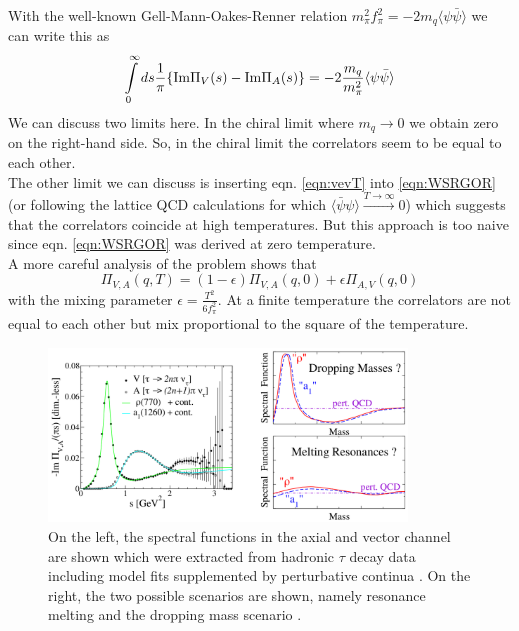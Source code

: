 With the well-known Gell-Mann-Oakes-Renner relation $m_{\pi}^2f_{\pi}^2 = - 2 m_q \langle \psi \bar{\psi} \rangle$ we can write this as
\begin{equation}
\label{eqn:WSRGOR}
\int\limits_0^{\infty} ds \frac{1}{\pi} \lbrace \mathrm{Im}\Pi_V(s) - \mathrm{Im}\Pi_A(s) \rbrace = - 2 \frac{m_q}{m_{\pi}^2} \langle \psi \bar{\psi} \rangle
\end{equation}
We can discuss two limits here. In the chiral limit where $m_q \rightarrow 0$ we obtain zero on the right-hand side. So, in the chiral limit the correlators seem to be equal to each other. \\
The other limit we can discuss is inserting eqn. \ref{eqn:vevT} into \ref{eqn:WSRGOR} (or following the lattice QCD calculations for which $\langle \bar{\psi} \psi \rangle \overset{T \rightarrow \infty}{\longrightarrow} 0$) which suggests that the correlators coincide at high temperatures. 
But this approach is too naive since eqn. \ref{eqn:WSRGOR} was derived at zero temperature. \\
A more careful analysis of the problem shows that \cite{DeyAVmixing}
\begin{equation}
\Pi_{V,A}(q,T) = (1-\epsilon) \Pi_{V,A}(q,0) + \epsilon \Pi_{A,V}(q,0)
\end{equation}
with the mixing parameter $\epsilon = \frac{T^2}{6f_{\pi}^2}$. At a finite temperature the correlators are not equal to each other but mix proportional to the square of the temperature. \\
\begin{figure}[t]
	\centering
	\includegraphics[width=0.85\textwidth]{Figures/SpectralFunctions}
	\caption{ On the left, the spectral functions in the axial and vector channel are shown which were extracted from hadronic $\tau$ decay data \cite{ALEPHplot} including model fits supplemented by perturbative continua \cite{RappPlot}. On the right, the two possible scenarios are shown, namely resonance melting and the dropping mass scenario \cite{RappChiRes}.}
	\label{fig:SpecFun}
\end{figure}
